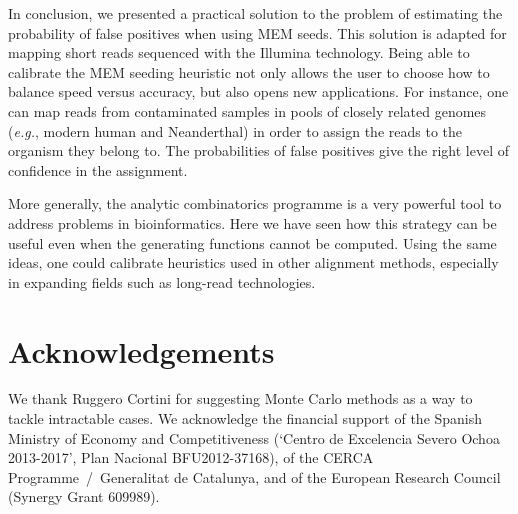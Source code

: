 \documentclass{article}
\begin{document}
In conclusion, we presented a practical solution to the problem of
estimating the probability of false positives when using MEM seeds. This
solution is adapted for mapping short reads sequenced with the Illumina
technology. Being able to calibrate the MEM seeding heuristic not only
allows the user to choose how to balance speed versus accuracy, but also
opens new applications. For instance, one can map reads from contaminated
samples in pools of closely related genomes (\textit{e.g.}, modern human
and Neanderthal) in order to assign the reads to the organism they belong
to. The probabilities of false positives give the right level of
confidence in the assignment.

More generally, the analytic combinatorics programme is a very powerful
tool to address problems in bioinformatics. Here we have seen how this
strategy can be useful even when the generating functions cannot be
computed. Using the same ideas, one could calibrate heuristics used in
other alignment methods, especially in expanding fields such as long-read
technologies.


\section*{Acknowledgements}

We thank Ruggero Cortini for suggesting Monte Carlo methods as a way to
tackle intractable cases. We acknowledge the financial support of the
Spanish Ministry of Economy and Competitiveness (‘Centro de Excelencia
Severo Ochoa 2013-2017’, Plan Nacional BFU2012-37168), of the CERCA
Programme~/~Generalitat de Catalunya, and of the European Research Council
(Synergy Grant 609989).






\end{document}
